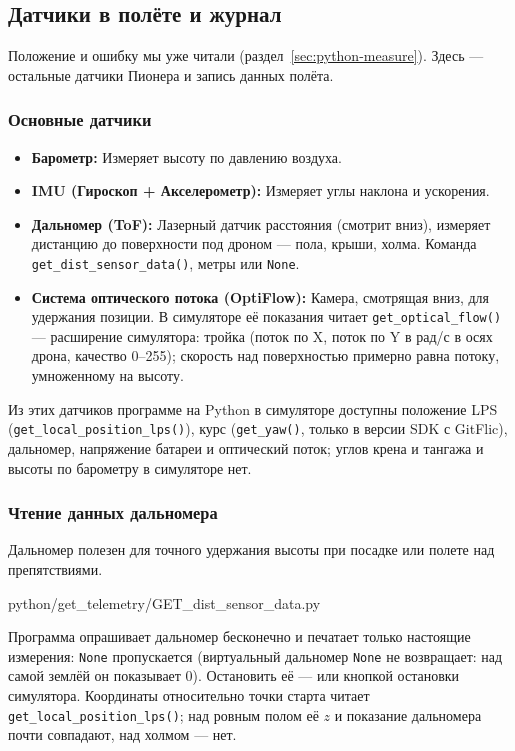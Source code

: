 \subsection{Датчики в полёте и журнал}

Положение и ошибку мы уже читали (раздел~\ref{sec:python-measure}). Здесь --- остальные датчики Пионера и запись данных полёта.

\subsubsection*{Основные датчики}
\begin{itemize}
    \item \textbf{Барометр:} Измеряет высоту по давлению воздуха.
    \item \textbf{IMU (Гироскоп + Акселерометр):} Измеряет углы наклона и ускорения.
    \item \textbf{Дальномер (ToF):} Лазерный датчик расстояния (смотрит вниз), измеряет дистанцию до поверхности под дроном --- пола, крыши, холма. Команда \texttt{get\_dist\_sensor\_data()}, метры или \texttt{None}.
    \item \textbf{Система оптического потока (OptiFlow):} Камера, смотрящая вниз, для удержания позиции. В симуляторе её показания читает \texttt{get\_optical\_flow()} --- расширение симулятора: тройка (поток по X, поток по Y в рад/с в осях дрона, качество 0--255); скорость над поверхностью примерно равна потоку, умноженному на высоту.
\end{itemize}

Из этих датчиков программе на Python в симуляторе доступны положение LPS (\texttt{get\_local\_position\_lps()}), курс (\texttt{get\_yaw()}, только в версии SDK с GitFlic), дальномер, напряжение батареи и оптический поток; углов крена и тангажа и высоты по барометру в симуляторе нет.

\subsubsection*{Чтение данных дальномера}
Дальномер полезен для точного удержания высоты при посадке или полете над препятствиями.

\begin{codefile}[python]{python/get_telemetry/GET_dist_sensor_data.py}
\end{codefile}

Программа опрашивает дальномер бесконечно и печатает только настоящие измерения: \texttt{None} пропускается (виртуальный дальномер \texttt{None} не возвращает: над самой землёй он показывает 0). Остановить её ---  или кнопкой остановки симулятора. Координаты относительно точки старта читает \texttt{get\_local\_position\_lps()}; над ровным полом её $z$ и показание дальномера почти совпадают, над холмом --- нет.

